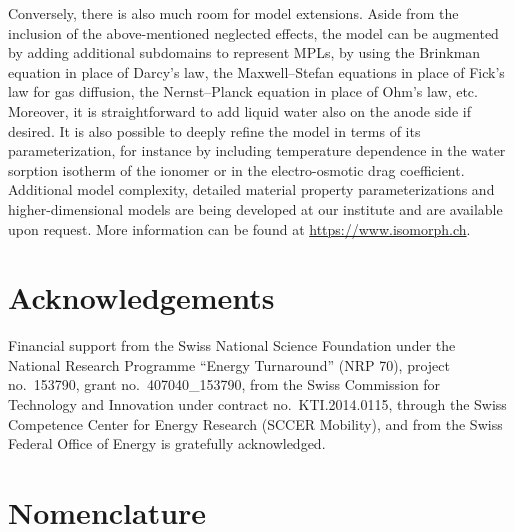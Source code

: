 \documentclass[fontsize=9pt,DIV=calc,a4paper,twocolumn]{scrartcl}
\begin{document}
Conversely, there is also much room for model extensions. Aside from the inclusion of the above-mentioned neglected effects, the model can be augmented by adding additional subdomains to represent MPLs, by using the Brinkman equation in place of Darcy's law, the Maxwell--Stefan equations in place of Fick's law for gas diffusion, the Nernst--Planck equation in place of Ohm's law, etc. Moreover, it is straightforward to add liquid water also on the anode side if desired. It is also possible to deeply refine the model in terms of its parameterization, for instance by including temperature dependence in the water sorption isotherm of the ionomer or in the electro-osmotic drag coefficient. Additional model complexity, detailed material property parameterizations and higher-dimensional models are being developed at our institute and are available upon request. More information can be found at \url{https://www.isomorph.ch}.

\section*{Acknowledgements}

Financial support from the Swiss National Science Foundation under the National Research Programme ``Energy Turnaround'' (NRP 70), project no.\ 153790, grant no.\ 407040\_153790, from the Swiss Commission for Technology and Innovation under contract no.\ KTI.2014.0115, through the Swiss Competence Center for Energy Research (SCCER Mobility), and from the Swiss Federal Office of Energy is gratefully acknowledged.

\newpage
\section*{Nomenclature}

\end{document}
